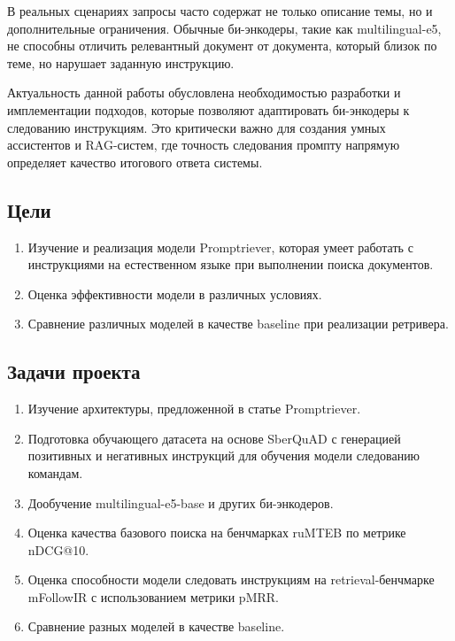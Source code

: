 \documentclass[12pt, a4paper, oneside]{article}
\begin{document}
В реальных сценариях запросы часто содержат не только описание темы, но и дополнительные ограничения. 
Обычные би-энкодеры, такие как multilingual-e5, не способны 
отличить релевантный документ от документа, который близок по теме, но нарушает заданную инструкцию. 

Актуальность данной работы обусловлена необходимостью разработки и имплементации подходов, которые 
позволяют адаптировать би-энкодеры к следованию инструкциям. 
Это критически важно для создания умных ассистентов и RAG-систем, 
где точность следования промпту напрямую определяет качество итогового ответа системы.

\subsection{Цели}

\begin{enumerate}
    \item Изучение и реализация модели Promptriever, которая умеет работать с инструкциями на естественном языке при выполнении поиска документов. 
    
    \item Оценка эффективности модели в различных условиях. 

    \item Сравнение различных моделей в качестве baseline при реализации ретривера. 
\end{enumerate}

\subsection{Задачи проекта}

\begin{enumerate}
    \item Изучение архитектуры, предложенной в статье Promptriever.
    
    \item Подготовка обучающего датасета на основе SberQuAD \cite{sberquad}  с генерацией позитивных и негативных инструкций 
    для обучения модели следованию командам.
    
    \item Дообучение multilingual-e5-base \cite{wang2024multilingual} и других би-энкодеров. 
    
    \item Оценка качества базового поиска на бенчмарках ruMTEB \cite{snegirev2025russianfocusedembeddersexplorationrumteb} по метрике nDCG@10.
    
    \item Оценка способности модели следовать инструкциям на retrieval-бенчмарке mFollowIR 
    \cite{weller2025mfollowirmultilingualbenchmarkinstruction} с использованием 
    метрики pMRR.

    \item Сравнение разных моделей в качестве baseline.
\end{enumerate}
\end{document}
